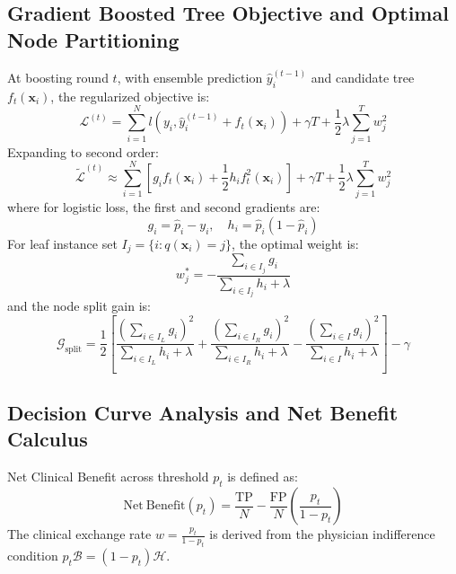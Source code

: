 \documentclass[conference]{IEEEtran}
\begin{document}
\subsection{Gradient Boosted Tree Objective and Optimal Node Partitioning}
At boosting round $t$, with ensemble prediction $\hat{y}_i^{(t-1)}$ and candidate tree $f_t(\mathbf{x}_i)$, the regularized objective is:
\begin{equation}
\mathcal{L}^{(t)} = \sum_{i=1}^N l\left(y_i, \hat{y}_i^{(t-1)} + f_t(\mathbf{x}_i)\right) + \gamma T + \frac{1}{2}\lambda \sum_{j=1}^T w_j^2
\end{equation}
Expanding to second order:
\begin{equation}
\tilde{\mathcal{L}}^{(t)} \approx \sum_{i=1}^N \left[ g_i f_t(\mathbf{x}_i) + \frac{1}{2} h_i f_t^2(\mathbf{x}_i) \right] + \gamma T + \frac{1}{2}\lambda \sum_{j=1}^T w_j^2
\end{equation}
where for logistic loss, the first and second gradients are:
\begin{equation}
g_i = \hat{p}_i - y_i, \quad h_i = \hat{p}_i(1 - \hat{p}_i)
\end{equation}
For leaf instance set $I_j = \{i : q(\mathbf{x}_i) = j\}$, the optimal weight is:
\begin{equation}
w_j^* = -\frac{\sum_{i \in I_j} g_i}{\sum_{i \in I_j} h_i + \lambda}
\end{equation}
and the node split gain is:
\begin{equation}
\mathcal{G}_{\text{split}} = \frac{1}{2}\left[ \frac{\left(\sum_{i \in I_L} g_i\right)^2}{\sum_{i \in I_L} h_i + \lambda} + \frac{\left(\sum_{i \in I_R} g_i\right)^2}{\sum_{i \in I_R} h_i + \lambda} - \frac{\left(\sum_{i \in I} g_i\right)^2}{\sum_{i \in I} h_i + \lambda} \right] - \gamma
\end{equation}

\subsection{Decision Curve Analysis and Net Benefit Calculus}
Net Clinical Benefit across threshold $p_t$ is defined as:
\begin{equation}
\mathrm{Net\ Benefit}(p_t) = \frac{\mathrm{TP}}{N} - \frac{\mathrm{FP}}{N} \left(\frac{p_t}{1 - p_t}\right)
\end{equation}
The clinical exchange rate $w = \frac{p_t}{1 - p_t}$ is derived from the physician indifference condition $p_t \mathcal{B} = (1 - p_t) \mathcal{H}$.
\end{document}
